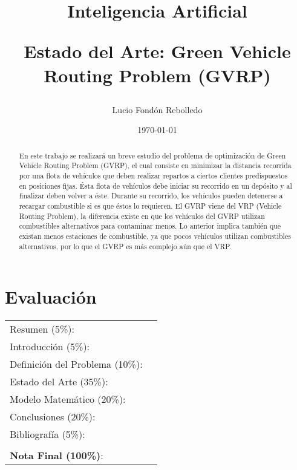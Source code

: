 \documentclass[letter, 10pt]{article}
\begin{document}
\title{Inteligencia Artificial \\ \begin{Large}Estado del Arte: Green Vehicle Routing
Problem (GVRP)\end{Large}}
\author{Lucio Fondón Rebolledo}
\date{\today}
\maketitle


\section*{Evaluaci\'on}

\begin{tabular}{ll}
Resumen (5\%): & \underline{\hspace{2cm}} \\
Introducci\'on (5\%):  & \underline{\hspace{2cm}} \\
Definici\'on del Problema (10\%):  & \underline{\hspace{2cm}} \\
Estado del Arte (35\%):  & \underline{\hspace{2cm}} \\
Modelo Matem\'atico (20\%): &  \underline{\hspace{2cm}}\\
Conclusiones (20\%): &  \underline{\hspace{2cm}}\\
Bibliograf\'ia (5\%): & \underline{\hspace{2cm}}\\
 &  \\
\textbf{Nota Final (100\%)}:   & \underline{\hspace{2cm}}
\end{tabular}
\vspace{2cm}


\begin{abstract}

En este trabajo se realizará un breve estudio del problema de optimización de Green Vehicle Routing Problem (GVRP), el cual consiste en minimizar la distancia recorrida por una flota de vehículos que deben realizar repartos a ciertos clientes predispuestos en posiciones fijas. Ésta flota de vehículos debe iniciar su recorrido en un depósito y al finalizar deben volver a éste. Durante su recorrido, los vehículos pueden detenerse a recargar combustible si es que éstos lo requieren. El GVRP viene del VRP (Vehicle Routing Problem), la diferencia existe en que los vehículos del GVRP utilizan combustibles alternativos para contaminar menos. Lo anterior implica también que existan menos estaciones de combustible, ya que pocos vehículos utilizan combustibles alternativos, por lo que el GVRP es más complejo aún que el VRP.

\end{abstract}
\end{document}
